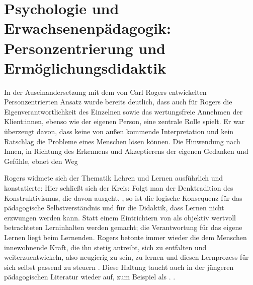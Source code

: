 \documentclass[
  twoside,
  parskip=half-,
]{scrreprt}
\begin{document}
\section{Psychologie und Erwachsenenpädagogik: Personzentrierung und Ermöglichungsdidaktik} In der Auseinandersetzung mit dem von Carl Rogers entwickelten Personzentrierten Ansatz wurde bereits deutlich, dass auch für Rogers die Eigenverantwortlichkeit des Einzelnen sowie das wertungsfreie Annehmen der Klient:innen, ebenso wie der eigenen Person, eine zentrale Rolle spielt. Er war überzeugt davon, dass keine von außen kommende Interpretation und kein Ratschlag die Probleme eines Menschen lösen können. Die Hinwendung nach Innen, in Richtung des Erkennens und Akzeptierens der eigenen Gedanken und Gefühle, ebnet den Weg 

 Rogers widmete sich der Thematik Lehren und Lernen ausführlich und konstatierte:   Hier schließt sich der Kreis: Folgt man der Denktradition des Konstruktivismus, die davon ausgeht, , so ist die logische Konsequenz für das pädagogische Selbstverständnis und für die Didaktik, dass Lernen nicht erzwungen werden kann. Statt einem Eintrichtern von als objektiv wertvoll betrachteten Lerninhalten werden  gemacht; die Verantwortung für das eigene Lernen liegt beim Lernenden. Rogers betonte immer wieder die dem Menschen innewohnende Kraft, die ihn stetig antreibt, sich zu entfalten und weiterzuentwickeln, also neugierig zu sein, zu lernen und diesen Lernprozess für sich selbst passend zu steuern \autocite[vgl.][157]{rogersLernenFreiheit}. Diese Haltung taucht auch in der jüngeren pädagogischen Literatur wieder auf, zum Beispiel als . . 
\end{document}
